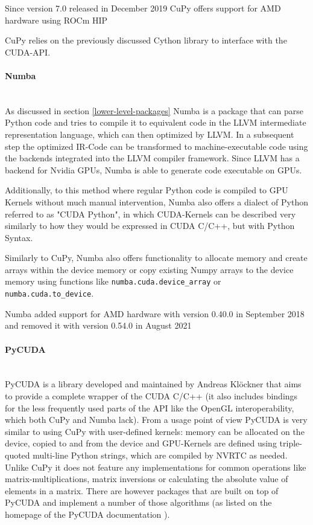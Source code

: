 \documentclass[english,11pt,a4paper,table]{article} %
\begin{document}
Since version 7.0 released in December 2019 CuPy offers support for AMD hardware using ROCm HIP

CuPy relies on the previously discussed Cython library to interface with the CUDA-API.

\paragraph*{Numba}\mbox{}\\

As discussed in section \ref{lower-level-packages} Numba \cite{lam2015numba} is a package that can parse Python code and tries to compile it to equivalent code in the LLVM intermediate representation language, which can then optimized by LLVM.
In a subsequent step the optimized IR-Code can be transformed to machine-executable code using the backends integrated into the LLVM compiler framework.
Since LLVM has a backend for Nvidia GPUs, Numba is able to generate code executable on GPUs.

Additionally, to this method where regular Python code is compiled to GPU Kernels without much manual intervention, Numba also offers a dialect of Python referred to as "CUDA Python", in which CUDA-Kernels can be described very similarly to how they would be expressed in CUDA C/C++, but with Python Syntax.

Similarly to CuPy, Numba also offers functionality to allocate memory and create arrays within the device memory or copy existing Numpy arrays to the device memory using functions like \texttt{numba.cuda.device\_array} or \texttt{numba.cuda.to\_device}.

Numba added support for AMD hardware with version 0.40.0 in September 2018 and removed it with version 0.54.0 in August 2021

\paragraph*{PyCUDA}\mbox{}\\
PyCUDA \cite{kloeckner_pycuda_2012} is a library developed and maintained by Andreas Klöckner that aims to provide a complete wrapper of the CUDA C/C++ (it also includes bindings for the less frequently used parts of the API like the OpenGL interoperability, which both CuPy and Numba lack).
From a usage point of view PyCUDA is very similar to using CuPy with user-defined kernels: memory can be allocated on the device, copied to and from the device and GPU-Kernels are defined using triple-quoted multi-line Python strings, which are compiled by NVRTC as needed.
Unlike CuPy it does not feature any implementations for common operations like matrix-multiplications, matrix inversions or calculating the absolute value of elements in a matrix.
There are however packages that are built on top of PyCUDA and implement a number of those algorithms (as listed on the homepage of the PyCUDA documentation \cite{pycuda2092:online}).
\end{document}
